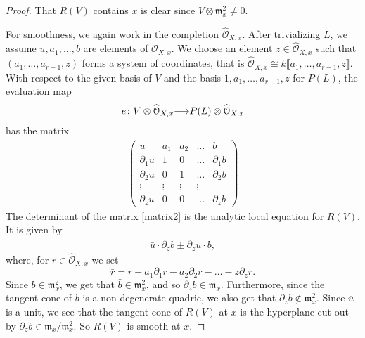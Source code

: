 \documentclass[11pt,reqno]{amsart}
\theoremstyle{plain}
\theoremstyle{definition}
\theoremstyle{remark}
\numberwithin{equation}{section}
\renewcommand{\to}{{\longrightarrow}}
\numberwithin{equation}{section}
\renewcommand{\O}{\mathcal O}
\begin{document}
\begin{proof}
  That $R(V)$ contains $x$ is clear since $V \otimes \mathfrak{m}^{2}_{x} \neq 0$.

  For smoothness, we again work in the completion $\widehat{\O}_{X,x}$.
  After trivializing $L$, we assume $u, a_{1}, ..., b$ are elements of $\widehat{\O}_{X,x}$.
  We choose an element $z \in \widehat{\O}_{X,x}$ such that $(a_1, \dots, a_{r-1}, z)$ forms a system of coordinates, that is $\widehat{\O}_{X,x} \cong k\llbracket a_{1}, \dots , a_{r-1}, z \rrbracket$.
  With respect to the given basis of $V$ and the basis $1, a_1, \dots, a_{r-1}, z$ for $P(L)$, the evaluation map
  \begin{align*}
  e\from V \otimes \widehat{\O}_{X,x} \to P(L) \otimes \widehat{\O}_{X,x}
  \end{align*}
  has the matrix
\begin{align}\label{matrix2}
\begin{pmatrix}
  u & a_{1} & a_{2} & \dots & b \\
  \partial_{1}u & 1 & 0 & \dots & \partial_{1}b \\
  \partial_{2}u & 0 & 1 & \dots & \partial_{2}b \\
  \vdots & \vdots & \vdots & \vdots \\
  \partial_{z}u  & 0 & 0 & \dots & \partial_{z}b
\end{pmatrix}
\end{align}
The determinant of the matrix \eqref{matrix2} is the analytic local equation for $R(V)$.
It is given by
\begin{align*}
   \bar{u} \cdot \partial_{z}b \pm \partial_{z}u \cdot \bar{b},
 \end{align*} 
 where, for $r \in \widehat{\O}_{X,x}$ we set
 \[\bar{r} = r - a_{1}\partial_{1}r - a_{2}\partial_{2}r - \dots - z \partial_{z} r.\]
 Since $b \in {\mathfrak m}^{2}_{x}$, we get that $\bar{b} \in {\mathfrak m}^{2}_{x}$, and so $\partial_{z}b \in {\mathfrak m}_{x}$.
 Furthermore, since the tangent cone of $b$ is a non-degenerate quadric, we also get that $\partial_z b \not \in \mathfrak m_x^2$.
 Since $\overline{u}$ is a unit, we see that the tangent cone of $R(V)$ at $x$ is the hyperplane cut out by $\partial_z b \in \mathfrak m_x/\mathfrak m_x^2$.
 So $R(V)$ is smooth at $x$.
\end{proof}
\end{document}
